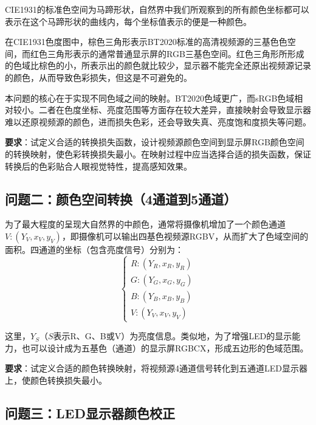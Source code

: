 CIE1931的标准色空间为马蹄形状，自然界中我们所观察到的所有颜色坐标都可以表示在这个马蹄形状的曲线内，每个坐标值表示的便是一种颜色。

在CIE1931色度图中，棕色三角形表示BT2020标准的高清视频源的三基色色空间，而红色三角形表示的通常普通显示屏的RGB三基色空间。红色三角形所形成的色域比棕色的小，所表示出的颜色就比较少，显示器不能完全还原出视频源记录的颜色，从而导致色彩损失，但这是不可避免的。

本问题的核心在于实现不同色域之间的映射。BT2020色域更广，而sRGB色域相对较小。二者在色度坐标、亮度范围等方面存在较大差异，直接映射会导致显示器难以还原视频源的颜色，进而损失色彩，还会导致失真、亮度饱和度损失等问题。

\textbf{要求}：试定义合适的转换损失函数，设计视频源颜色空间到显示屏RGB颜色空间的转换映射，使色彩转换损失最小。在映射过程中应当选择合适的损失函数，保证转换后的色彩贴合人眼视觉特性，提高感知效果。

\subsection[\hspace{-2pt}问题二：颜色空间转换（4通道到5通道）]{{\heiti{} \hspace{-8pt}问题二：颜色空间转换（4通道到5通道）}}\label{subsection1: 问题二}

为了最大程度的呈现大自然界的中颜色，通常将摄像机增加了一个颜色通道$V:(Y_V,x_V,y_V)$，即摄像机可以输出四基色视频源RGBV，从而扩大了色域空间的面积。四通道的坐标（包含亮度信号）分别为：
\begin{equation}
\begin{cases}
R:(Y_R,x_R,y_R) \\
G:(Y_G,x_G,y_G) \\
B:(Y_B,x_B,y_B) \\
V:(Y_V,x_V,y_V)
\end{cases}
\end{equation}

这里，$Y_S$（$S$表示R、G、B或V）为亮度信息。类似地，为了增强LED的显示能力，也可以设计成为五基色（通道）的显示屏RGBCX，形成五边形的色域范围。

\textbf{要求}：试定义合适的颜色转换映射，将视频源4通道信号转化到五通道LED显示器上，使颜色转换损失最小。

\subsection[\hspace{-2pt}问题三：LED显示器颜色校正]{{\heiti{} \hspace{-8pt}问题三：LED显示器颜色校正}}\label{subsection1: 问题三}

